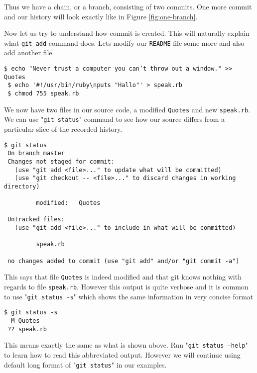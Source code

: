 \documentclass{article}
\theoremstyle{definition}
\begin{document}
        \noindent Thus we have a chain, or a branch, consisting of two commits. One more commit and our history will
        look exactly like in Figure \ref{fig:one-branch}.

        Now let us try to understand how commit is created. This will naturally explain what \texttt{git add} command
        does. Lets modify our \texttt{README} file some more and also add another file.

        \begin{Verbatim}[frame=single]
 $ echo "Never trust a computer you can’t throw out a window." >> Quotes
 $ echo '#!/usr/bin/ruby\nputs "Hallo"' > speak.rb
 $ chmod 755 speak.rb
        \end{Verbatim}
        We now have two files in our source code, a modified \texttt{Quotes} and new \texttt{speak.rb}. We can use
        "\texttt{git status}" command to see how our source differs from a particular slice of the recorded history.

        \begin{Verbatim}[frame=single]
 $ git status
 On branch master
 Changes not staged for commit:
   (use "git add <file>..." to update what will be committed)
   (use "git checkout -- <file>..." to discard changes in working directory)

         modified:   Quotes

 Untracked files:
   (use "git add <file>..." to include in what will be committed)

         speak.rb

 no changes added to commit (use "git add" and/or "git commit -a")
        \end{Verbatim}

        \noindent This says that file \texttt{Quotes} is indeed modified and that git knows nothing with regards to file
        \texttt{speak.rb}. However this output is quite verbose and it is common to use "\texttt{git status -s}" which
        shows the same information in very concise format

        \begin{Verbatim}[frame=single]
 $ git status -s
  M Quotes
 ?? speak.rb
        \end{Verbatim}
        This means exactly the same as what is shown above. Run "\texttt{git status --help}" to learn how to read this
        abbreviated output. However we will continue using default long format of "\texttt{git status}" in our examples.
        \newpage
\end{document}
